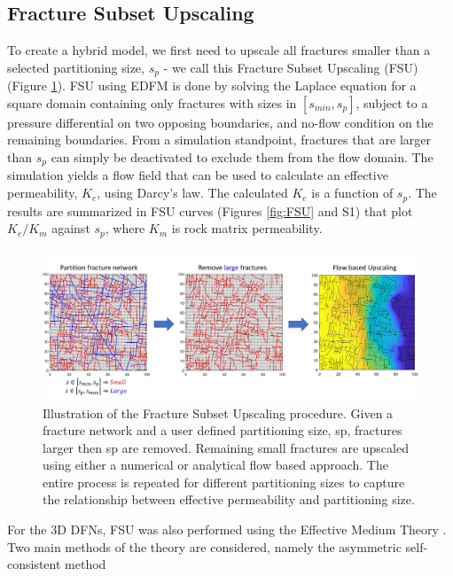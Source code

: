 \documentclass[draft]{agujournal2018}
\begin{document}
\subsection{Fracture Subset Upscaling}
To create a hybrid model, we first need to upscale all fractures smaller than a selected partitioning size, $s_p$ - we call this Fracture Subset Upscaling (FSU) (Figure \ref{fig:FSU_Scheme}). FSU using EDFM is done by solving the Laplace equation for a square domain containing only fractures with sizes in $[s_{min},s_p]$, subject to a pressure differential on two opposing boundaries, and no-flow condition on the remaining boundaries. From a simulation standpoint, fractures that are larger than $s_p$ can simply be deactivated to exclude them from the flow domain. The simulation yields a flow field that can be used to calculate an effective permeability, $K_{e}$, using Darcy's law. The calculated $K_{e}$ is a function of $s_p$. The results are summarized in FSU curves (Figures \ref{fig:FSU} and S1) that plot $K_{e}/K_m$ against $s_p$, where $K_m$ is rock matrix permeability.

\begin{figure}[h]
	\centering
	
	\includegraphics[width=\textwidth]{FSU_Scheme.jpg}
	
	\caption{Illustration of the Fracture Subset Upscaling procedure. Given a fracture network and a user defined partitioning size, sp, fractures larger then sp are removed. Remaining small fractures are upscaled using either a numerical or analytical flow based approach. The entire process is repeated for different partitioning sizes to capture the relationship between effective permeability and partitioning size.}
	\label{fig:FSU_Scheme}
\end{figure}

For the 3D DFNs, FSU was also performed using the Effective Medium Theory \citep{Saevik2013}. Two main methods of the theory are considered, namely the asymmetric self-consistent method
\end{document}
